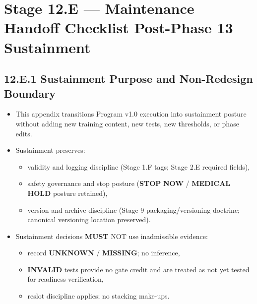 \documentclass[10pt]{article}
\begin{document}
\section*{Stage 12.E — Maintenance Handoff Checklist Post-Phase 13 Sustainment}
{}

\subsection*{12.E.1 Sustainment Purpose and Non-Redesign Boundary}
{}

\begin{itemize}
\item This appendix transitions Program v1.0 execution into sustainment posture without adding new training content, new tests, new thresholds, or phase edits.
\item Sustainment preserves:
  \begin{itemize}
  \item validity and logging discipline (Stage 1.F tags; Stage 2.E required fields),
  \item safety governance and stop posture (\textbf{STOP} \textbf{NOW} / \textbf{MEDICAL} \textbf{HOLD} posture retained),
  \item version and archive discipline (Stage 9 packaging/versioning doctrine; canonical versioning location preserved).
  \end{itemize}
\item Sustainment decisions \textbf{MUST} NOT use inadmissible evidence:
  \begin{itemize}
  \item record \textbf{UNKNOWN} / \textbf{MISSING}; no inference,
  \item \textbf{INVALID} tests provide no gate credit and are treated as not yet tested for readiness verification,
  \item reslot discipline applies; no stacking make-ups.
  \end{itemize}
\end{itemize}

\newpage
\end{document}
